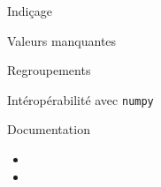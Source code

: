 \begin{frame}{Indiçage}
  
\end{frame}

\begin{frame}{Valeurs manquantes}
  
\end{frame}

\begin{frame}{Regroupements}
  
\end{frame}

\begin{frame}{Intéropérabilité avec \texttt{numpy}}
  
\end{frame}

\begin{frame}{Documentation}
  \begin{itemize}
    \item {}
    \item {}
  \end{itemize}
\end{frame}

